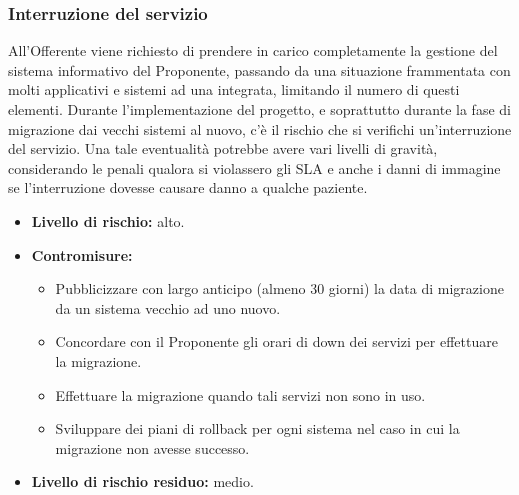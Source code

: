				\subsubsection{Interruzione del servizio}
                	All'Offerente viene richiesto di prendere in carico completamente la gestione del sistema informativo del Proponente, passando da una situazione frammentata con molti applicativi e sistemi ad una integrata, limitando il numero di questi elementi. Durante l'implementazione del progetto, e soprattutto durante la fase di migrazione dai vecchi sistemi al nuovo, c'è il rischio che si verifichi un'interruzione del servizio. Una tale eventualità potrebbe avere vari livelli di gravità, considerando le penali qualora si violassero gli SLA e anche i danni di immagine se l'interruzione dovesse causare danno a qualche paziente.
                    \begin{itemize}
                    	\item \textbf{Livello di rischio:} alto.
                        \item \textbf{Contromisure:} 
                        \begin{itemize}
                        	\item Pubblicizzare con largo anticipo (almeno 30 giorni) la data di migrazione da un sistema vecchio ad uno nuovo.
                            \item Concordare con il Proponente gli orari di down dei servizi per effettuare la migrazione.
                            \item Effettuare la migrazione quando tali servizi non sono in uso.
                            \item Sviluppare dei piani di rollback per ogni sistema nel caso in cui la migrazione non avesse successo.
                        \end{itemize}
                        \item \textbf{Livello di rischio residuo:} medio.
                    \end{itemize}
                    
